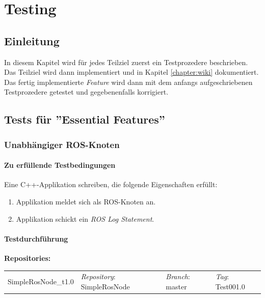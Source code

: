 \chapter{Testing}
\label{chapter:testing}
\section{Einleitung}
In diesem Kapitel wird für jedes Teilziel zuerst ein Testprozedere beschrieben.
Das Teilziel wird dann implementiert und in Kapitel \ref{chapter:wiki} dokumentiert.
Das fertig implementierte \textit{Feature} wird dann mit dem anfangs aufgeschriebenen Testprozedere getestet und gegebenenfalls korrigiert.


\section{Tests für ''Essential Features''}
\subsection{Unabhängiger ROS-Knoten}
\subsubsection{Zu erfüllende Testbedingungen}
Eine C++-Applikation schreiben, die folgende Eigenschaften erfüllt:
\begin{enumerate}
\item Applikation meldet sich als ROS-Knoten an.
\item Applikation schickt ein \textit{ROS Log Statement}.
\end{enumerate}

\subsubsection{Testdurchführung}
\textbf{Repositories:} \\
\begin{tabular}
  { l						| l			 							l								 l								}
  SimpleRosNode\_t1.0		& \textit{Repository}: SimpleRosNode	& \textit{Branch}: master		& \textit{Tag}: Test001.0 		\\
\end{tabular}

